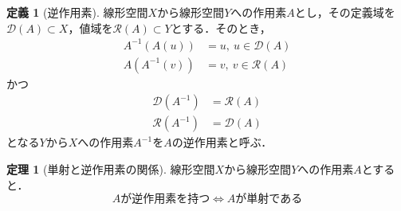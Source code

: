\documentclass[11pt,a4paper,titlepage]{jsreport}
\theoremstyle{definition}
\newtheorem{dfn}{定義}
\newtheorem{thm}{定理}
\begin{document}
\begin{dfn}[逆作用素]
  \label{dfn:逆作用素}
  線形空間$X$から線形空間$Y$への作用素$A$とし，その定義域を$\mathcal{D}(A)\subset X$，値域を$\mathcal{R}(A)\subset Y$とする．そのとき，
  \begin{align*}
    A^{-1}\left( A\left( u \right) \right) & =u, \  u\in\mathcal{D}\left( A \right) \\
    A(A^{-1}(v))                           & =v, \  v\in\mathcal{R}(A)
  \end{align*}
  かつ
  \begin{align*}
    \mathcal{D}(A^{-1}) & =\mathcal{R}(A) \\
    \mathcal{R}(A^{-1}) & =\mathcal{D}(A)
  \end{align*}
  となる$Y$から$X$への作用素$A^{-1}$を$A$の逆作用素と呼ぶ．
\end{dfn}

\begin{thm}[単射と逆作用素の関係]
  \label{thm:単射と逆作用素の関係}
  線形空間$X$から線形空間$Y$への作用素$A$とすると．
  \begin{equation*}
    Aが逆作用素を持つ \Leftrightarrow Aが単射である
  \end{equation*}
\end{thm}
\end{document}

